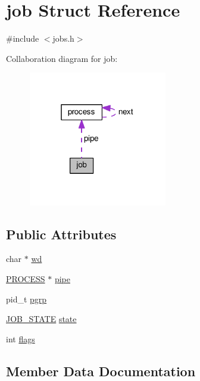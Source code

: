 \hypertarget{structjob}{}\section{job Struct Reference}
\label{structjob}


{\ttfamily \#include $<$jobs.\+h$>$}



Collaboration diagram for job\+:
\nopagebreak
\begin{figure}[H]
\begin{center}
\leavevmode
\includegraphics[width=171pt]{structjob__coll__graph}
\end{center}
\end{figure}
\subsection*{Public Attributes}
\begin{DoxyCompactItemize}
\item 
char $\ast$ \hyperlink{structjob_ab27dfab9ba607cb3bbdd2b6f2b4e3efc}{wd}
\item 
\hyperlink{jobs_8h_a98d7f91a8b6b7bc43192267133fe951d}{P\+R\+O\+C\+E\+SS} $\ast$ \hyperlink{structjob_a7e5648df5ec2f0d459900325c2cc5816}{pipe}
\item 
pid\+\_\+t \hyperlink{structjob_a36d8fbcede662cb503c447511b10dabc}{pgrp}
\item 
\hyperlink{jobs_8h_a27f134c9d8392fc50ee339c518707f57}{J\+O\+B\+\_\+\+S\+T\+A\+TE} \hyperlink{structjob_a5bee3de4970de999192f8929f926a4fe}{state}
\item 
int \hyperlink{structjob_af96c169abb39b4b3f9ccce91cb4b17dc}{flags}
\end{DoxyCompactItemize}


\subsection{Member Data Documentation}
